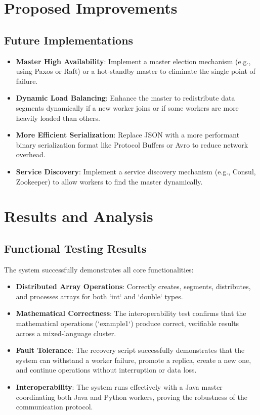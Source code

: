 \documentclass[10pt,a4paper]{article}
\theoremstyle{definition}
\theoremstyle{remark}
\begin{document}
\section{Proposed Improvements}

\subsection{Future Implementations}
\begin{itemize}
    \item \textbf{Master High Availability}: Implement a master election mechanism (e.g., using Paxos or Raft) or a hot-standby master to eliminate the single point of failure.
    \item \textbf{Dynamic Load Balancing}: Enhance the master to redistribute data segments dynamically if a new worker joins or if some workers are more heavily loaded than others.
    \item \textbf{More Efficient Serialization}: Replace JSON with a more performant binary serialization format like Protocol Buffers or Avro to reduce network overhead.
    \item \textbf{Service Discovery}: Implement a service discovery mechanism (e.g., Consul, Zookeeper) to allow workers to find the master dynamically.
\end{itemize}

\section{Results and Analysis}

\subsection{Functional Testing Results}
The system successfully demonstrates all core functionalities:
\begin{itemize}
    \item \textbf{Distributed Array Operations}: Correctly creates, segments, distributes, and processes arrays for both `int` and `double` types.
    \item \textbf{Mathematical Correctness}: The interoperability test confirms that the mathematical operations (`example1`) produce correct, verifiable results across a mixed-language cluster.
    \item \textbf{Fault Tolerance}: The recovery script successfully demonstrates that the system can withstand a worker failure, promote a replica, create a new one, and continue operations without interruption or data loss.
    \item \textbf{Interoperability}: The system runs effectively with a Java master coordinating both Java and Python workers, proving the robustness of the communication protocol.
\end{itemize}
\end{document}
